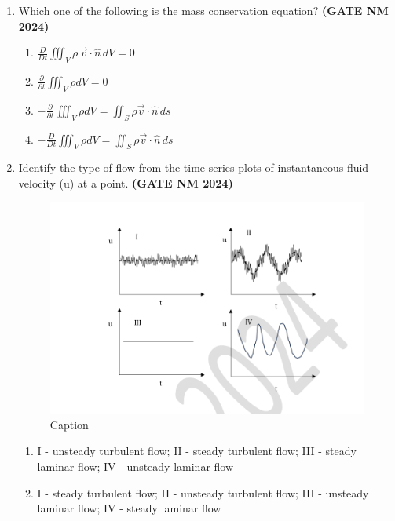 \documentclass[journal,15pt,onecolumn]{IEEEtran}
\theoremstyle{remark}
\begin{document}
\begin{enumerate}
\item Which one of the following is the mass conservation equation?\hfill \textbf{ (GATE NM 2024)}

  \begin{enumerate}
    \item 
    $
    \frac{D}{Dt} \iiint_V \rho \, \vec{v} \cdot \hat{n} \, dV = 0
    $
    \item 
    $
    \frac{\partial}{\partial t} \iiint_V \rho dV = 0
    $
    \item 
    $
    -\frac{\partial}{\partial t} \iiint_V \rho dV = \iint_S \rho \vec{v} \cdot \hat{n} \, ds
    $
    \item 
    $
    -\frac{D}{Dt} \iiint_V \rho dV = \iint_S \rho \vec{v} \cdot \hat{n} \, ds
    $
  \end{enumerate}

 \item Identify the type of flow from the time series plots of instantaneous fluid velocity (u) at a point.\hfill \textbf{ (GATE NM 2024)}

\begin{figure}[h!]
    \centering
    \includegraphics[width=1.0\linewidth]{figures.tex/Screenshot 2025-08-20 155122.png}
    \caption{Caption}
    \label{fig:placeholder}
\end{figure}



\begin{enumerate}
    \item I - unsteady turbulent flow; II - steady turbulent flow; 
    III - steady laminar flow; IV - unsteady laminar flow

    \item I - steady turbulent flow; II - unsteady turbulent flow; 
    III - unsteady laminar flow; IV - steady laminar flow


\end{enumerate}
\end{enumerate}
\end{document}
